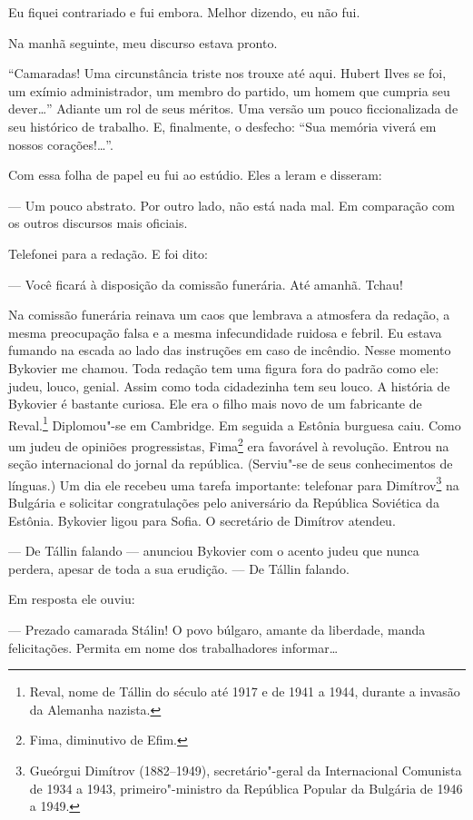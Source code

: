 Eu fiquei contrariado e fui embora. Melhor dizendo, eu não fui.

Na manhã seguinte, meu discurso estava pronto.

``Camaradas! Uma circunstância triste nos trouxe até aqui. Hubert Ilves
se foi, um exímio administrador, um membro do partido, um homem que
cumpria seu dever\ldots{}'' Adiante um rol de seus méritos. Uma versão um
pouco ficcionalizada de seu histórico de trabalho. E, finalmente, o
desfecho: ``Sua memória viverá em nossos corações!\ldots{}''.

Com essa folha de papel eu fui ao estúdio. Eles a leram e disseram:

--- Um pouco abstrato. Por outro lado, não está nada mal. Em comparação
com os outros discursos mais oficiais.

Telefonei para a redação. E foi dito:

--- Você ficará à disposição da comissão funerária. Até amanhã. Tchau!

Na comissão funerária reinava um caos que lembrava a atmosfera da
redação, a mesma preocupação falsa e a mesma infecundidade ruidosa e
febril. Eu estava fumando na escada ao lado das instruções em caso de
incêndio. Nesse momento Bykovier me chamou. Toda redação tem uma figura
fora do padrão como ele: judeu, louco, genial. Assim como toda
cidadezinha tem seu louco. A história de Bykovier é bastante curiosa.
Ele era o filho mais novo de um fabricante de Reval.\footnote{Reval,
  nome de Tállin do século  até 1917 e de 1941 a 1944, durante a
  invasão da Alemanha nazista.} Diplomou"-se em Cambridge. Em seguida a
Estônia burguesa caiu. Como um judeu de opiniões progressistas,
Fima\footnote{Fima, diminutivo de Efim.} era favorável à revolução.
Entrou na seção internacional do jornal da república. (Serviu"-se de seus
conhecimentos de línguas.) Um dia ele recebeu uma tarefa importante:
telefonar para Dimítrov\footnote{Gueórgui Dimítrov (1882--1949),
  secretário"-geral da Internacional Comunista de 1934 a 1943,
  primeiro"-ministro da República Popular da Bulgária de 1946 a 1949.} na
Bulgária e solicitar congratulações pelo aniversário da República
Soviética da Estônia. Bykovier ligou para Sofia. O secretário de
Dimítrov atendeu.

--- De Tállin falando --- anunciou Bykovier com o acento judeu que nunca
perdera, apesar de toda a sua erudição. --- De Tállin falando.

Em resposta ele ouviu:

--- Prezado camarada Stálin! O povo búlgaro, amante da liberdade, manda
felicitações. Permita em nome dos trabalhadores informar\ldots{}

